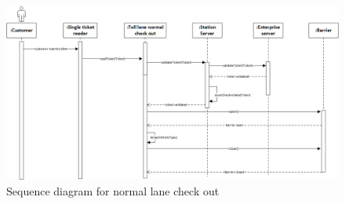 \documentclass{article}
\begin{document}
\begin{figure}
\centering
\includegraphics[width=0.7\linewidth]{"../sequence diagrams/sequence_diagram_single_ticket_check_out"}
\caption{Sequence diagram for normal lane check out}
\label{fig:sequence_diagram_single_ticket_check_out}
\end{figure}
\end{document}
